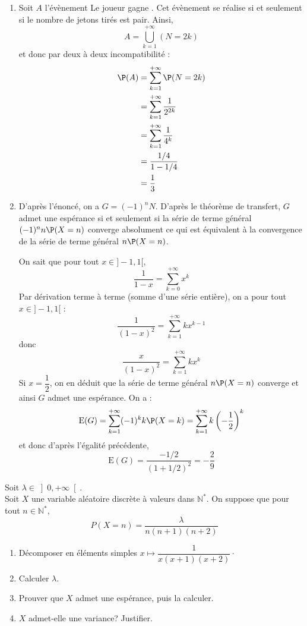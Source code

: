 \documentclass[a4paper,10pt]{report}
\begin{document}
\corr \begin{enumerate}
\item Soit $A$ l'évènement \og Le joueur gagne \fg . Cet évènement se réalise si et seulement si le nombre de jetons tirés est pair. Ainsi,
$$ A = \bigcup_{k=1}^{+ \infty} (N=2k) $$
et donc par deux à deux incompatibilité :
\begin{align*}
\P(A) & = \sum_{k=1}^{+ \infty} \P(N=2k) \\
& = \sum_{k=1}^{+ \infty} \dfrac{1}{2^{2k}} \\
& = \sum_{k=1}^{+ \infty} \dfrac{1}{4^k} \\
& = \dfrac{1/4}{1-1/4}  \\
& = \dfrac{1}{3} 
\end{align*}
\item D'après l'énoncé, on a $G=(-1)^n N$. D'après le théorème de transfert, $G$ admet une espérance si et seulement si la série de terme général $(-1)^n n \P(X=n)$ converge absolument ce qui est équivalent à la convergence de la série de terme général $n \P(X=n)$.

\medskip

\noindent  On sait que pour tout $x \in ]-1,1[$,
$$ \dfrac{1}{1-x} = \sum_{k=0}^{+ \infty} x^k$$
Par dérivation terme à terme (somme d'une série entière), on a pour tout $x \in ]-1,1[$ :
$$ \dfrac{1}{(1-x)^2} = \sum_{k=1}^{+ \infty} k x^{k-1}$$
donc 
$$ \dfrac{x}{(1-x)^2} = \sum_{k=1}^{+ \infty} kx^k$$
Si $x= \dfrac{1}{2}$, on en déduit que la série de terme général $n \P(X=n)$ converge et ainsi $G$ admet une espérance. On a :
$$ \textrm{E}(G) = \sum_{k=1}^{+ \infty} (-1)^k k \P(X=k) = \sum_{k=1}^{+ \infty} k \left( -\dfrac{1}{2} \right)^k$$
et donc d'après l'égalité précédente,
$$ \textrm{E}(G) = \dfrac{-1/2}{(1+1/2)^2} = - \dfrac{2}{9}$$
\end{enumerate}

\begin{Exercice}{}Soit $\lambda \in{\left] 0,+\infty\right[ }$.\\
Soit $X$ une variable aléatoire discrète à valeurs dans $\mathbb{N}^\ast$. On suppose que pour tout $n \in \mathbb{N}^*$, 
$$P(X=n)=\dfrac{\lambda}{n(n+1)(n+2)} $$
\begin{enumerate}
\item Décomposer en éléments simples $x \mapsto \dfrac{1}{x(x+1)(x+2)} \cdot$
\item
Calculer $\lambda$.
\item
Prouver que $X$ admet une espérance, puis la calculer.
\item
$X$ admet-elle une variance? Justifier.
\end{enumerate}
\end{Exercice}
\end{document}
